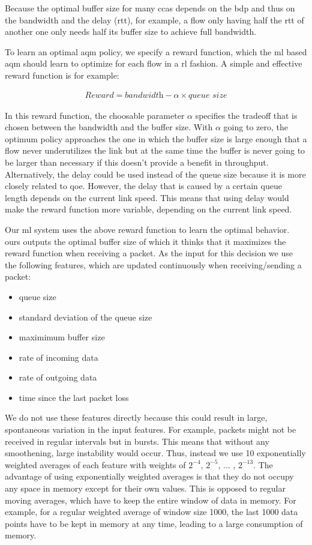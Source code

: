 \documentclass[conference]{IEEEtran}
\begin{document}
Because the optimal buffer size for many \glspl{cca} depends on the \gls{bdp} and thus on the bandwidth and the delay (\gls{rtt}), for example, a flow only having half the \gls{rtt} of another one only needs half its buffer size to achieve full bandwidth. 

To learn an optimal \gls{aqm} policy, we specify a reward function, which the \gls{ml} based \gls{aqm} should learn to optimize for each flow in a \gls{rl} fashion. A simple and effective reward function is for example:

\begin{align}
\textit{Reward} = \textit{bandwidth}-\alpha\times\textit{queue size}
\label{eq:reward}
\end{align}

In this reward function, the choosable parameter $\alpha$ specifies the tradeoff that is chosen between the bandwidth and the buffer size. With $\alpha$ going to zero, the optimum policy approaches the one in which the buffer size is large enough that a flow never underutilizes the link but at the same time the buffer is never going to be larger than necessary if this doesn't provide a benefit in throughput. Alternatively, the delay could be used instead of the queue size because it is more closely related to \gls{qoe}. However, the delay that is caused by a certain queue length depends on the current link speed. This means that using delay would make the reward function more variable, depending on the current link speed. 

Our \gls{ml} system uses the above reward function to learn the optimal behavior. \gls{ours} outputs the optimal buffer size of which it thinks that it maximizes the reward function when receiving a packet. As the input for this decision we use the following features, which are updated continuously when receiving/sending a packet: 
\begin{itemize}
\item queue size
\item standard deviation of the queue size 
\item maximimum buffer size
\item rate of incoming data
\item rate of outgoing data
\item time since the last packet loss
\end{itemize}
We do not use these features directly because this could result in large, spontaneous variation in the input features. For example, packets might not be received in regular intervals but in bursts. This means that without any smoothening, large instability would occur. Thus, instead we use 10 exponentially weighted averages of each feature with weights of $2^{-4}$, $2^{-5}$, ... , $2^{-13}$. The advantage of using exponentially weighted averages is that they do not occupy any space in memory except for their own values. This is opposed to regular moving averages, which have to keep the entire window of data in memory. For example, for a regular weighted average of window size 1000, the last 1000 data points have to be kept in memory at any time, leading to a large consumption of memory. 
\end{document}
